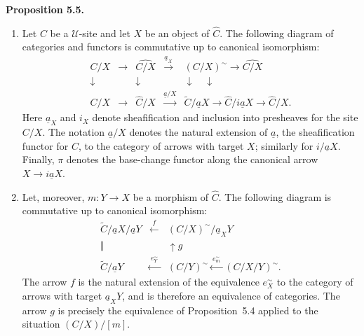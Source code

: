 \documentclass[11pt]{article}
\newcommand{\U}{\mathcal{U}}
\newenvironment{statement}[1]{\par\medskip\noindent\textbf{#1.}\ }{\par\medskip}
\begin{document}
\begin{statement}{Proposition 5.5}
\begin{enumerate}[label=\arabic*)]
\item Let \(C\) be a \(\U\)-site and let \(X\) be an object of \(\widehat C\). The following diagram of categories and functors is commutative up to canonical isomorphism:
\[
\begin{array}{ccccc}
C/X&\to&\widehat{C/X}&\xrightarrow{\underline a_X}&(C/X)^\sim\to\widehat{C/X}\\
\downarrow&&\downarrow&&\downarrow\quad\downarrow\\
C/X&\to&\widehat C/X&\xrightarrow{\underline a/X}&\widetilde C/\underline aX\to\widehat C/i\underline aX\to\widehat C/X.
\end{array}
\]
Here \(\underline a_X\) and \(i_X\) denote sheafification and inclusion into presheaves for the site \(C/X\). The notation \(\underline a/X\) denotes the natural extension of \(\underline a\), the sheafification functor for \(C\), to the category of arrows with target \(X\); similarly for \(i/\underline aX\). Finally, \(\pi\) denotes the base-change functor along the canonical arrow \(X\to i\underline aX\).

\item Let, moreover, \(m:Y\to X\) be a morphism of \(\widehat C\). The following diagram is commutative up to canonical isomorphism:
\[
\begin{array}{ccc}
\widetilde C/\underline aX/\underline aY & \xleftarrow{\ f\ } &(C/X)^\sim/\underline a_XY\\
\big\Vert && \uparrow g\\
\widetilde C/\underline aY & \xleftarrow{\ e_Y^\sim\ } &(C/Y)^\sim \xleftarrow{\ e_m^\sim\ } (C/X/Y)^\sim .
\end{array}
\]
The arrow \(f\) is the natural extension of the equivalence \(e_X^\sim\) to the category of arrows with target \(\underline a_XY\), and is therefore an equivalence of categories. The arrow \(g\) is precisely the equivalence of Proposition~5.4 applied to the situation \((C/X)/[m]\).


\end{enumerate}
\end{statement}
\end{document}
